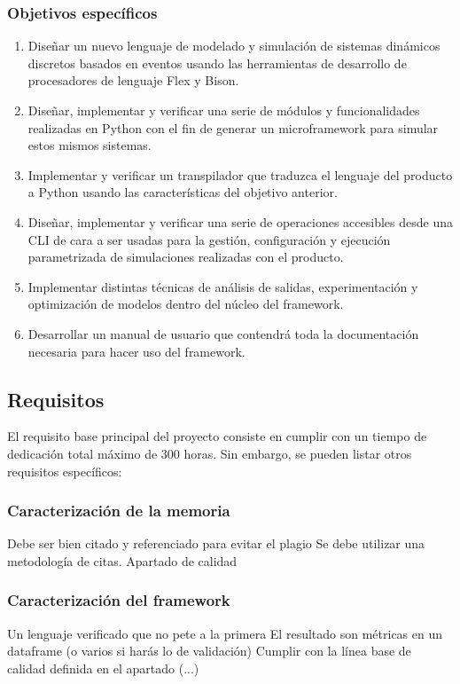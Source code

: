 \subsubsection{Objetivos específicos}
\begin{enumerate}
    \item Diseñar un nuevo lenguaje de modelado y simulación de sistemas
    dinámicos discretos basados en eventos usando las herramientas de desarrollo
    de procesadores de lenguaje Flex y Bison.
    \item Diseñar, implementar y verificar una serie de módulos y
    funcionalidades realizadas en Python con el fin de generar un microframework
    para simular estos mismos sistemas.
    \item Implementar y verificar un transpilador que traduzca el lenguaje del
    producto a Python usando las características del objetivo anterior.
    \item Diseñar, implementar y verificar una serie de operaciones accesibles
    desde una CLI de cara a ser usadas para la gestión, configuración y
    ejecución parametrizada de simulaciones realizadas con el producto.
    \item Implementar distintas técnicas de análisis de salidas, experimentación
    y optimización de modelos dentro del núcleo del framework.
    \item Desarrollar un manual de usuario que contendrá toda la documentación
    necesaria para hacer uso del framework.
\end{enumerate}

\subsection{Requisitos}
El requisito base principal del proyecto consiste en cumplir con un tiempo de
dedicación total máximo de 300 horas. Sin embargo, se pueden listar otros
requisitos específicos:

\subsubsection{Caracterización de la memoria}
Debe ser bien citado y referenciado para evitar el plagio
Se debe utilizar una metodología de citas.
Apartado de calidad

\subsubsection{Caracterización del framework}
Un lenguaje verificado que no pete a la primera
El resultado son métricas en un dataframe (o varios si harás lo de validación)
Cumplir con la línea base de calidad definida en el apartado (...)

